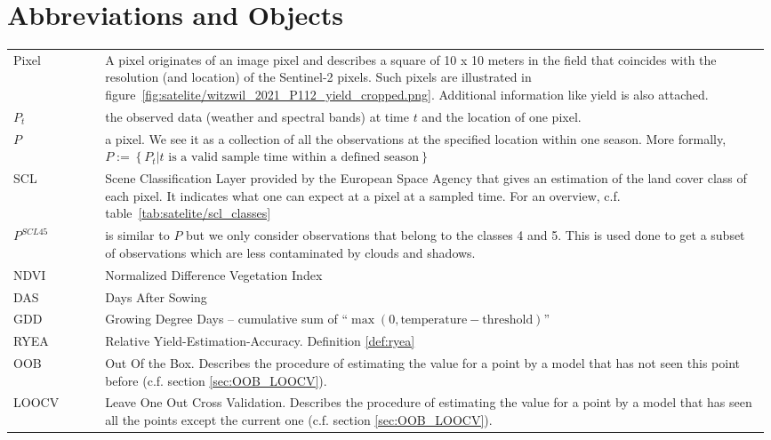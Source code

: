 \section*{Abbreviations and Objects}
\begin{longtable}{p{0.12\linewidth} p{0.87\linewidth}}
Pixel	
		& A pixel originates of an image pixel and describes a square of 10 x 10 meters in the field that coincides with the resolution (and location) of the Sentinel-2 pixels. Such pixels are illustrated in figure~\ref{fig:satelite/witzwil_2021_P112_yield_cropped.png}. Additional information like yield is also attached.\\

$P_t$	
		& the observed data (weather and spectral bands) at time $t$ and the location of one pixel. \\

$P$	
		& a pixel. We see it as a collection of all the observations at the specified location within one season. More formally, $P := \left\{P_t | t\text{ is a valid sample time within a defined season}\right\}$\\

SCL	
		& Scene Classification Layer provided by the European Space Agency that gives an estimation of the land cover class of each pixel. It indicates what one can expect at a pixel at a sampled time. For an overview, c.f. table~\ref{tab:satelite/scl_classes}\\

$P^{SCL45}$	
		& is similar to $P$ but we only consider observations that belong to the classes 4 and 5. This is used done to get a subset of observations which are less contaminated by clouds and shadows.\\

NDVI	
		& Normalized Difference Vegetation Index \citep{rouseMonitoringVernalAdvancement1974}\\

DAS	
		& Days After Sowing\\

GDD	
		& Growing Degree Days -- cumulative sum of ``$\max(0, \text{temperature}-\text{threshold})$''\\

RYEA 	
		& Relative Yield-Estimation-Accuracy. Definition \ref{def:ryea}\\

OOB 	
		& Out Of the Box. Describes the procedure of  estimating the value for a point by a model that has not seen this point before (c.f. section \ref{sec:OOB_LOOCV}).\\

LOOCV 	
		& Leave One Out Cross Validation. Describes the procedure of estimating the value for a point by a model that has seen all the points except the current one (c.f. section \ref{sec:OOB_LOOCV}).\\
\end{longtable} 

